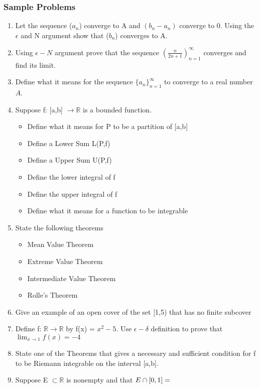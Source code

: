 \documentclass[12pt]{article}
\begin{document}
\subsubsection*{Sample Problems}
\begin{enumerate}
    \item Let the sequence ($a_n$) converge to A and $(b_n - a_n)$ converge to 0. Using the $\epsilon$ and N argument show that ($b_n$) converges to A. 
    \item Using $\epsilon-N$ argument prove that the sequence $(\frac{n}{2n+1})_{n=1}^{\infty}$ converges and find its limit.
    \item Define what it means for the sequence $\{a_n\}^\infty_{n=1}$ to converge to a real number $A$.
    \item Suppose f: [a,b] $\to \mathbb{R}$ is a bounded function. 
    \begin{itemize}
        \item Define what it means for P to be a partition of [a,b]
        \item Define a Lower Sum L(P,f)
        \item Define a Upper Sum U(P,f)
        \item Define the lower integral of f
        \item Define the upper integral of f 
        \item Define what it means for a function to be integrable 
    \end{itemize}
    \item State the following theorems 
    \begin{itemize}
        \item Mean Value Theorem
        \item Extreme Value Theorem
        \item Intermediate Value Theorem 
        \item Rolle's Theorem 
    \end{itemize}
    \item Give an example of an open cover of the set [1,5) that has no finite subcover 
    \item Define f: $\mathbb{R} \to \mathbb{R}$ by f(x) = $x^{2} - 5$. Use $\epsilon-\delta$ definition to prove that $\lim_{x \to 1} f(x) = -4$ 
    \item State one of the Theorems that gives a necessary and sufficient condition for f to be Riemann integrable on the interval [a,b].
    \item Suppose E $\subset \mathbb{R}$ is nonempty and that $E \cap [0,1] = \empty$

\end{enumerate}
\end{document}
